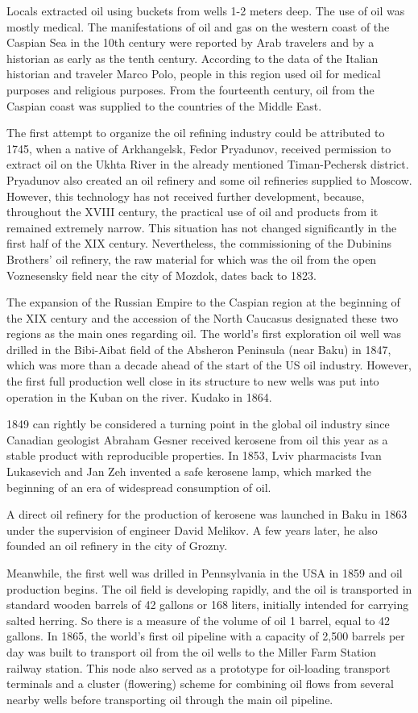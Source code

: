 \documentclass[12pt]{report}
\theoremstyle{definition}
\begin{document}
Locals extracted oil using buckets from wells 1-2 meters deep.
The use of oil was mostly medical.
The manifestations of oil and gas on the western coast of the Caspian Sea in the 10th century were reported by Arab travelers and by a historian as early as the tenth century.
According to the data of the Italian historian and traveler Marco Polo, people in this region used oil for medical purposes and religious purposes.
From the fourteenth century, oil from the Caspian coast was supplied to the countries of the Middle East.

The first attempt to organize the oil refining industry could be attributed to 1745, when a native of Arkhangelsk, Fedor Pryadunov, received permission to extract oil on the Ukhta River in the already mentioned Timan-Pechersk district.
Pryadunov also created an oil refinery and some oil refineries supplied to Moscow.
However, this technology has not received further development, because, throughout the XVIII century, the practical use of oil and products from it remained extremely narrow.
This situation has not changed significantly in the first half of the XIX century.
Nevertheless, the commissioning of the Dubinins Brothers' oil refinery, the raw material for which was the oil from the open Voznesensky field near the city of Mozdok, dates back to 1823.

The expansion of the Russian Empire to the Caspian region at the beginning of the XIX century and the accession of the North Caucasus designated these two regions as the main ones regarding oil.
The world's first exploration oil well was drilled in the Bibi-Aibat field of the Absheron Peninsula (near Baku) in 1847, which was more than a decade ahead of the start of the US oil industry.
However, the first full production well close in its structure to new wells was put into operation in the Kuban on the river.
Kudako in 1864.

1849 can rightly be considered a turning point in the global oil industry since Canadian geologist Abraham Gesner received kerosene from oil this year as a stable product with reproducible properties.
In 1853, Lviv pharmacists Ivan Lukasevich and Jan Zeh invented a safe kerosene lamp, which marked the beginning of an era of widespread consumption of oil.

A direct oil refinery for the production of kerosene was launched in Baku in 1863 under the supervision of engineer David Melikov.
A few years later, he also founded an oil refinery in the city of Grozny.

Meanwhile, the first well was drilled in Pennsylvania in the USA in 1859 and oil production begins.
The oil field is developing rapidly, and the oil is transported in standard wooden barrels of 42 gallons or 168 liters, initially intended for carrying salted herring.
So there is a measure of the volume of oil 1 barrel, equal to 42 gallons.
In 1865, the world's first oil pipeline with a capacity of 2,500 barrels per day was built to transport oil from the oil wells to the Miller Farm Station railway station.
This node also served as a prototype for oil-loading transport terminals and a cluster (flowering) scheme for combining oil flows from several nearby wells before transporting oil through the main oil pipeline.
\end{document}
